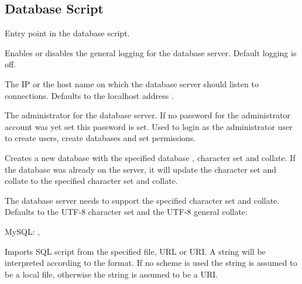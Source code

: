 \subsection{Database Script}



Entry point in the database script.


Enables or disables the general logging for the database server.
Default logging is off.


The IP  or the host name on which the database server should listen
to connections. Defaults to the localhost address .


The administrator  for the database server. If no password for
the administrator account was yet set this password is set. Used to login as
the administrator user to create users, create databases and set permissions.


Creates a new database with the specified database , character set and collate.
If the database was already on the server, it will update the character set and collate
to the specified character set and collate.

The database server needs to support the specified character set and collate.
Defaults to the UTF-8 character set and the UTF-8 general collate:

\begin{compactitem}
\item MySQL: , 
\end{compactitem}


Imports SQL script  from the specified file, URL or URI. 
A string will be interpreted according to the format. If no scheme is used 
the string is assumed to be a local file, otherwise the string is assumed to 
be a URI.

